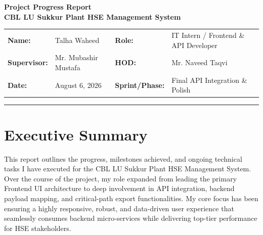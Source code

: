 \documentclass[12pt, a4paper]{article}
\begin{document}
\begin{center}
    {\Huge\bfseries\color{primary} Project Progress Report}\\[0.5cm]
    {\Large\bfseries CBL LU Sukkur Plant HSE Management System}\\[1cm]
\end{center}

\noindent\begin{tabularx}{\textwidth}{@{}lXlX@{}}
    \textbf{Name:} & Talha Waheed & \textbf{Role:} & IT Intern / Frontend \& API Developer \\
    \textbf{Supervisor:} & Mr. Mubashir Mustafa & \textbf{HOD:} & Mr. Naveed Taqvi \\
    \textbf{Date:} & August 6, 2026 & \textbf{Sprint/Phase:} & Final API Integration \& Polish \\
\end{tabularx}
\vspace{0.5cm}
\hrule
\vspace{1cm}

\section{Executive Summary}
This report outlines the progress, milestones achieved, and ongoing technical tasks I have executed for the CBL LU Sukkur Plant HSE Management System. Over the course of the project, my role expanded from leading the primary Frontend UI architecture to deep involvement in API integration, backend payload mapping, and critical-path export functionalities. My core focus has been ensuring a highly responsive, robust, and data-driven user experience that seamlessly consumes backend micro-services while delivering top-tier performance for HSE stakeholders.
\end{document}
